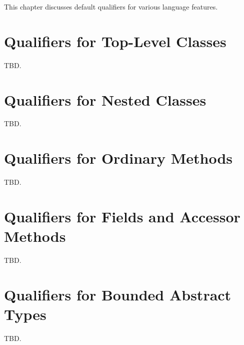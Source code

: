 This chapter discusses default qualifiers for various language features.


\section{Qualifiers for Top-Level Classes}
TBD.

\section{Qualifiers for Nested Classes}
TBD.

\section{Qualifiers for Ordinary Methods}
TBD.

\section{Qualifiers for Fields and Accessor Methods}
TBD.

\section{Qualifiers for Bounded Abstract Types}
TBD.

